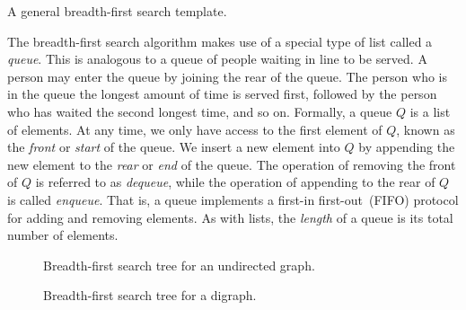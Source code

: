 \begin{algorithm}[!htbp]

\caption{A general breadth-first search template.}
\label{alg:graph_algorithms:breadth_first_search_template}
\end{algorithm}

The breadth-first search algorithm makes
use of a special type of list called a \emph{queue}. This
is analogous to a queue of people waiting in line to be served. A
person may enter the queue by joining the rear of the queue. The
person who is in the queue the longest amount of time is served first,
followed by the person who has waited the second longest time, and so
on. Formally, a queue $Q$ is a list of elements. At any
time, we only have access to the first element of $Q$, known as the
\emph{front} or \emph{start} of
the queue. We insert a new element into $Q$ by appending the new
element to the \emph{rear} or
\emph{end} of the queue. The operation of removing
the front of $Q$ is referred to as \emph{dequeue},
while the operation of appending to the rear of $Q$ is called
\emph{enqueue}. That is, a queue implements a first-in
first-out~(FIFO) protocol for
adding and removing elements. As with lists, the
\emph{length} of a queue is its total number of
elements.

\begin{figure}[!htbp]
\centering
{}

\caption{Breadth-first search tree for an undirected graph.}
\label{fig:graph_algorithms:breadth_first_search_undirected}
\end{figure}

\begin{figure}[!htbp]
\centering
{}

\caption{Breadth-first search tree for a digraph.}
\label{fig:graph_algorithms:breadth_first_search_directed}
\end{figure}

